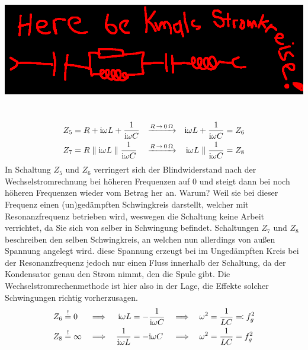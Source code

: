 \begin{center}\includegraphics[width=.6\textwidth]{placeholder.png}\end{center}~\\
%
%
\begin{align*}
    \qquad&&Z_5 &= R + \mathrm{i} \omega L + \frac{1}{\mathrm{i} \omega C} & \xrightarrow{R \,\rightarrow \,\SI{0}{\ohm}} && \mathrm{i} \omega L + \frac{1}{\mathrm{i} \omega C} &= Z_6 
    &&\qquad\\
    \qquad&&Z_7 &= R \parallel \mathrm{i} \omega L \parallel \frac{1}{\mathrm{i} \omega C} & \xrightarrow{R \,\rightarrow \,\SI{0}{\ohm}} && \mathrm{i} \omega L \parallel \frac{1}{\mathrm{i} \omega C} &= Z_8 &&\qquad\\
\end{align*}
In Schaltung $Z_5$ und $Z_6$ verringert sich der Blindwiderstand nach der Wechselstromrechnung bei höheren Frequenzen auf 0 und steigt dann bei noch höheren Frequenzen wieder vom Betrag her an.
Warum? Weil sie bei dieser Frequenz einen (un)gedämpften Schwingkreis darstellt, welcher mit Resonanzfrequenz betrieben wird, weswegen die Schaltung keine Arbeit verrichtet, da Sie sich von selber in Schwingung befindet.
Schaltungen $Z_7$ und $Z_8$ beschreiben den selben Schwingkreis, an welchen nun allerdings von außen 
Spannung angelegt wird. diese Spannung erzeugt bei im Ungedämpften Kreis bei der Resonanzfrequenz jedoch nur einen Fluss innerhalb der Schaltung, da der Kondensator genau den Strom nimmt, den die Spule gibt.
Die Wechselstromrechenmethode ist hier also in der Lage, die Effekte solcher Schwingungen richtig vorherzusagen.
\begin{align*}
    Z_6 &\stackrel{!}{=} 0 &\implies&& \mathrm{i} \omega L &= -\frac{1}{\mathrm{i} \omega C} &\implies&& \omega^2 &= \frac{1}{LC} \eqqcolon f_{g}^2\\
    Z_8 &\stackrel{!}{=} \infty &\implies&& \frac{1}{\mathrm{i} \omega L} &= -\mathrm{i} \omega C &\implies&& \omega^2 &= \frac{1}{LC} = f_{g}^2\\
\end{align*}